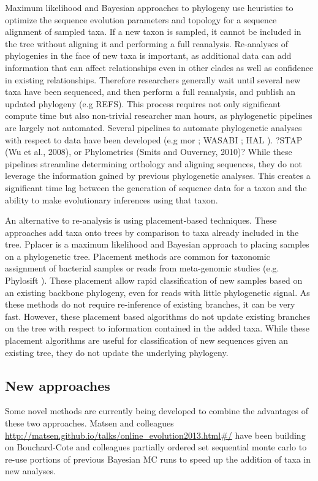 \documentclass[10pt]{article}
\begin{document}
Maximum likelihood and Bayesian approaches to phylogeny use heuristics to optimize the sequence evolution parameters and topology for a sequence alignment of sampled taxa. If a new taxon is sampled, it cannot be included in the tree without aligning it and performing a full reanalysis.  Re-analyses of phylogenies in the face of new taxa is important, as additional data can add information that can affect relationships even in other clades as well as confidence in existing relationships. Therefore researchers generally wait until several new taxa have been sequenced, and then perform a full reanalysis, and publish an updated phylogeny (e.g REFS). This process requires not only significant compute time but also non-trivial researcher man hours, as phylogenetic pipelines are largely not automated. Several pipelines to automate phylogenetic analyses with respect to data have been developed (e.g mor \cite{hibbett_automated_2005}; WASABI \cite{kauff_WASABI:_2007}; HAL \cite{robbertse_hal:_2011}). ?STAP (Wu et al., 2008), or Phylometrics (Smits and Ouverney, 2010)? While these pipelines streamline determining orthology and aligning sequences, they do not leverage the information gained by previous phylogenetic analyses. %
This creates a significant time lag between the generation of sequence data for a taxon and the ability to make evolutionary inferences using that taxon.

An alternative to re-analysis is using placement-based techniques. These approaches add taxa onto trees by comparison to taxa already included in the tree. 
Pplacer \cite{matsen_pplacer:_2010} is a maximum likelihood and Bayesian approach to placing samples on a phylogenetic tree. Placement methods are common for taxonomic assignment of bacterial samples or reads from meta-genomic studies (e.g. Phylosift \cite{darling_phylosift:_2014}). These placement allow rapid classification of new samples based on an existing backbone phylogeny, even for reads with little phylogenetic signal. As these methods do not require re-inference of existing branches, it can be very fast. However, these placement based algorithms do not update existing branches on the tree with respect to information contained in the added taxa. While these placement algorithms are useful for classification of new sequences given an existing tree, they do not update the underlying phylogeny.%

\subsection*{New approaches}
Some novel methods are currently being developed to combine the advantages of these two approaches. Matsen and colleagues \url{http://matsen.github.io/talks/online_evolution2013.html#/} have been building on Bouchard-Cote and colleagues partially ordered set sequential monte carlo \cite{bouchard-cote_phylogenetic_2012} to re-use portions of previous Bayesian MC runs to speed up the addition of taxa in new analyses. %
\end{document}
